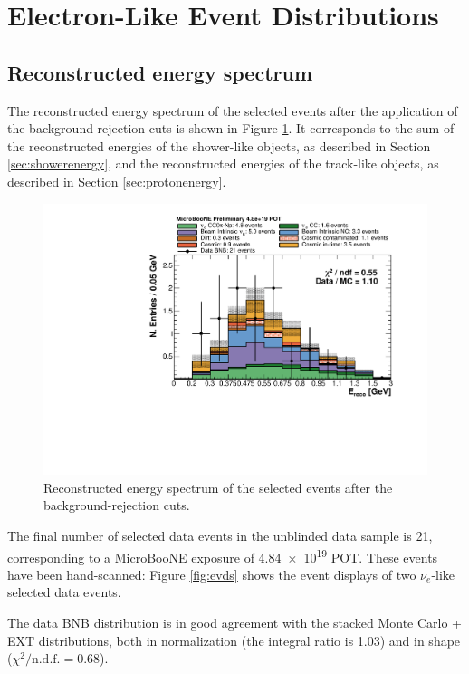 
\section{Electron-Like Event Distributions}\label{sec:electron_like}
\subsection{Reconstructed energy spectrum}
The reconstructed energy spectrum of the selected events after the application of the background-rejection cuts is shown in Figure \ref{fig:spectrum_after}. It corresponds to the sum of the reconstructed energies of the shower-like objects, as described in Section \ref{sec:showerenergy}, and the reconstructed energies of the track-like objects, as described in Section \ref{sec:protonenergy}. 

\begin{figure}[htbp]
\centering
  \includegraphics[width=0.65\linewidth]{figures/h_fixed_energy_after.pdf}
    \caption{Reconstructed energy spectrum of the selected events after the background-rejection cuts.}\label{fig:spectrum_after}

\end{figure}


The final number of selected data events in the unblinded data sample is 21, corresponding to a MicroBooNE exposure of \num{4.84e19} POT. These events have been hand-scanned: Figure \ref{fig:evds} shows the event displays of two $\nu_{e}$-like selected data events.


The data BNB distribution is in good agreement with the stacked Monte Carlo + EXT distributions, both in normalization (the integral ratio is 1.03) and in shape ($\chi^2 /\mathrm{n.d.f.} = 0.68$). 

